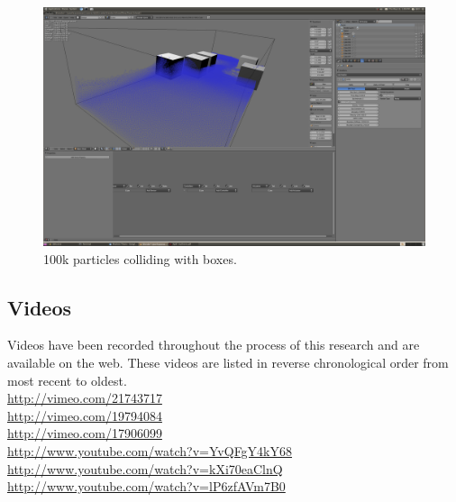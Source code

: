 \pagebreak
\begin{figure}[!htc]
		\includegraphics[scale=0.17]{figures/flood2.png}
        \caption{ 100k particles colliding with boxes. }
		\label{fig:flood2}
\end{figure}

\pagebreak
\clearpage

\subsection{Videos}

Videos have been recorded throughout the process of this research and are
available on the web. These videos are listed in reverse chronological order
from most recent to oldest. \\
\url{http://vimeo.com/21743717} \\
\url{http://vimeo.com/19794084} \\
\url{http://vimeo.com/17906099} \\
\url{http://www.youtube.com/watch?v=YvQFgY4kY68} \\
\url{http://www.youtube.com/watch?v=kXi70eaClnQ} \\
\url{http://www.youtube.com/watch?v=lP6zfAVm7B0} \\



